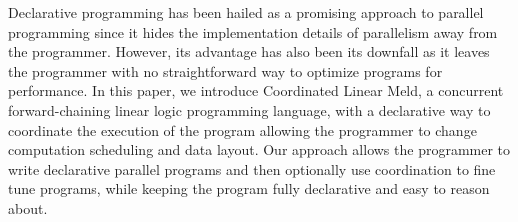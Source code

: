 Declarative programming has been hailed as a promising approach to parallel
programming since it hides the implementation details of parallelism away from the
programmer. However, its advantage has also been its downfall
as it leaves the programmer with no straightforward way
to optimize programs for performance.
In this paper, we introduce Coordinated Linear Meld, a concurrent forward-chaining linear logic programming
language, with a declarative way to coordinate the execution of the program
allowing the programmer to change
computation scheduling and data layout. Our approach allows the programmer to
write declarative parallel programs and then optionally use coordination 
to fine tune programs, while keeping the program fully declarative and easy to
reason about.
